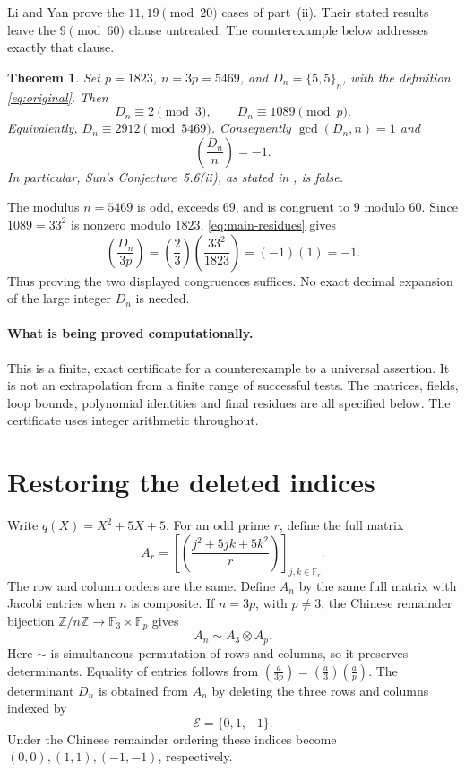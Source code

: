 \documentclass[11pt,a4paper]{article}
\newtheorem{theorem}{Theorem}[section]
\theoremstyle{remark}
\newcommand{\F}{\mathbb F}
\newcommand{\Z}{\mathbb Z}
\newcommand{\jac}[2]{\left(\frac{#1}{#2}\right)}
\begin{document}
Li and Yan \cite[Theorem~1.1(f), Remark~1.2]{LiYan2026} prove the
\(11,19\pmod{20}\) cases of part~(ii). Their stated results leave the
\(9\pmod{60}\) clause untreated. The counterexample below addresses
exactly that clause.

\begin{theorem}\label{thm:main}
Set \(p=1823\), \(n=3p=5469\), and \(D_n=\{5,5\}_n\), with the
definition \eqref{eq:original}. Then
\begin{equation}\label{eq:main-residues}
D_n\equiv2\pmod3,\qquad D_n\equiv1089\pmod p.
\end{equation}
Equivalently, \(D_n\equiv2912\pmod{5469}\). Consequently \(\gcd(D_n,n)=1\) and
\[
\jac{D_n}{n}=-1.
\]
In particular, Sun's Conjecture~5.6(ii), as stated in
\cite{Sun2024}, is false.
\end{theorem}

The modulus \(n=5469\) is odd, exceeds \(69\), and is congruent to
\(9\) modulo \(60\). Since \(1089=33^2\) is nonzero modulo \(1823\),
\eqref{eq:main-residues} gives
\[
\jac{D_n}{3p}
=\jac{2}{3}\jac{33^2}{1823}
=(-1)(1)=-1.
\]
Thus proving the two displayed congruences suffices. No exact decimal
expansion of the large integer \(D_n\) is needed.

\paragraph{What is being proved computationally.}
This is a finite, exact certificate for a counterexample to a universal
assertion. It is not an extrapolation from a finite range of successful
tests. The matrices, fields, loop bounds, polynomial identities and
final residues are all specified below. The certificate uses integer
arithmetic throughout.

\section{Restoring the deleted indices}

Write \(q(X)=X^2+5X+5\). For an odd prime \(r\), define the full matrix
\[
A_r=\left[\jac{j^2+5jk+5k^2}{r}\right]_{j,k\in\F_r}.
\]
The row and column orders are the same. Define \(A_n\) by the same full matrix with Jacobi entries when \(n\) is composite. If \(n=3p\), with \(p\ne3\),
the Chinese remainder bijection
\(\Z/n\Z\longrightarrow\F_3\times\F_p\) gives
\begin{equation}\label{eq:tensor}
A_n\sim A_3\otimes A_p.
\end{equation}
Here \(\sim\) is simultaneous permutation of rows and columns, so it
preserves determinants. Equality of entries follows from
\(\jac{a}{3p}=\jac{a}{3}\jac{a}{p}\).
The determinant \(D_n\) is obtained from \(A_n\) by deleting the
three rows and columns indexed by
\[
\mathcal E=\{0,1,-1\}.
\]
Under the Chinese remainder ordering these indices become
\((0,0),(1,1),(-1,-1)\), respectively.
\end{document}

